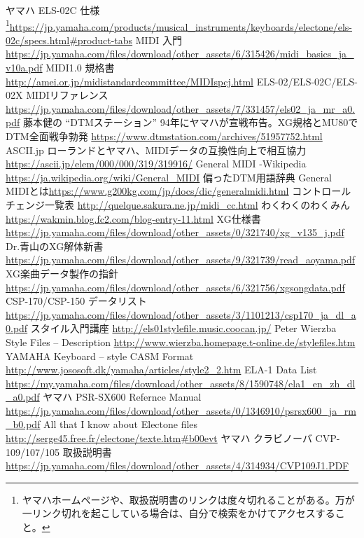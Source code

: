 \documentclass[uplatex, 10pt, dvipdfmx]{jsarticle}
\numberwithin{equation}{section}
\begin{document}
\begin{thebibliography}{99}
 ヤマハ ELS-02C 仕様\footnote{ヤマハホームページや、取扱説明書のリンクは度々切れることがある。万が一リンク切れを起こしている場合は、自分で検索をかけてアクセスすること。}\url{https://jp.yamaha.com/products/musical_instruments/keyboards/electone/els-02c/specs.html#product-tabs}
 MIDI 入門\url{https://jp.yamaha.com/files/download/other_assets/6/315426/midi_basics_ja_v10a.pdf}
 MIDI1.0 規格書 \url{http://amei.or.jp/midistandardcommittee/MIDIspcj.html}
 ELS-02/ELS-02C/ELS-02X MIDIリファレンス \url{https://jp.yamaha.com/files/download/other_assets/7/331457/els02_ja_mr_a0.pdf}
 藤本健の ``DTMステーション'' 94年にヤマハが宣戦布告。XG規格とMU80でDTM全面戦争勃発 \url{https://www.dtmstation.com/archives/51957752.html}
 ASCII.jp ローランドとヤマハ、MIDIデータの互換性向上で相互協力 \url{https://ascii.jp/elem/000/000/319/319916/}
 General MIDI -Wikipedia \url{https://ja.wikipedia.org/wiki/General_MIDI}
 偏ったDTM用語辞典 General MIDIとは\url{https://www.g200kg.com/jp/docs/dic/generalmidi.html}
 コントロールチェンジ一覧表 \url{http://quelque.sakura.ne.jp/midi_cc.html}
 わくわくのわくみん \url{https://wakmin.blog.fc2.com/blog-entry-11.html}
 XG仕様書 \url{https://jp.yamaha.com/files/download/other_assets/0/321740/xg_v135_j.pdf}
 Dr.青山のXG解体新書 \url{https://jp.yamaha.com/files/download/other_assets/9/321739/read_aoyama.pdf}
 XG楽曲データ製作の指針 \url{https://jp.yamaha.com/files/download/other_assets/6/321756/xgsongdata.pdf}
 CSP-170/CSP-150 データリスト \url{https://jp.yamaha.com/files/download/other_assets/3/1101213/csp170_ja_dl_a0.pdf}
 スタイル入門講座 \url{http://els01stylefile.music.coocan.jp/}
 Peter Wierzba Style Files -- Description \url{http://www.wierzba.homepage.t-online.de/stylefiles.htm}
 YAMAHA Keyboard -- style CASM Format \url{http://www.jososoft.dk/yamaha/articles/style2_2.htm}
 ELA-1 Data List \url{https://my.yamaha.com/files/download/other_assets/8/1590748/ela1_en_zh_dl_a0.pdf}
 ヤマハ PSR-SX600 Refernce Manual \url{https://jp.yamaha.com/files/download/other_assets/0/1346910/psrsx600_ja_rm_b0.pdf}
 All that I know about Electone files \url{http://serge45.free.fr/electone/texte.htm#b00evt}
 ヤマハ クラビノーバ CVP-109/107/105 取扱説明書 \url{https://jp.yamaha.com/files/download/other_assets/4/314934/CVP109J1.PDF}

\end{thebibliography}
\end{document}
